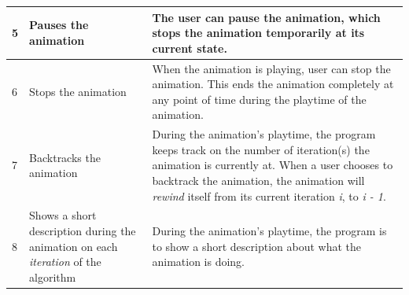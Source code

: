 \begin{table}[H]
\begin{center}
\begin{tabular}{| p{0.6cm} | p{6cm} | p{8cm} |}
    5 & Pauses the animation & The user can pause the animation, which stops the animation temporarily at its current state. \\ \hline
    6 & Stops the animation & When the animation is playing, user can stop the animation. This ends the animation completely at any point of time during the playtime of the animation. \\ \hline
    7 & Backtracks the animation & During the animation's playtime, the program keeps track on the number of iteration(s) the animation is currently at. When a user chooses to backtrack the animation, the animation will \textit{rewind} itself from its current iteration \textit{i}, to \textit{i - 1}. \\ \hline
    8 & Shows a short description during the animation on each \textit{iteration} of the algorithm & During the animation's playtime, the program is to show a short description about what the animation is doing. \\ \hline
\end{tabular}
\end{center}
\label{table:functionalRequirements}
\end{table}

\newpage
   
